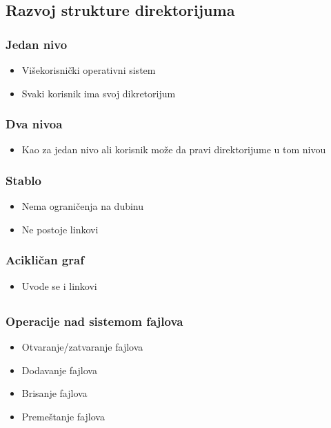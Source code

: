 \documentclass{beamer}
\begin{document}
\subsection*{Razvoj strukture direktorijuma}
\begin{frame}
    \frametitle{Jedan nivo}
    \begin{itemize}
        \item Višekorisnički operativni sistem \newline
        \item Svaki korisnik ima svoj dikretorijum 
    \end{itemize}
\end{frame}

\begin{frame}
    \frametitle{Dva nivoa}
    \begin{itemize}
        \item Kao za jedan nivo ali korisnik može da pravi direktorijume u tom nivou
    \end{itemize}

\end{frame}

\begin{frame}
    \frametitle{Stablo}
    \begin{itemize}
        \item Nema ograničenja na dubinu \newline
        \item Ne postoje linkovi
    \end{itemize}
\end{frame}

\begin{frame}
    \frametitle{Acikličan graf}
    \begin{itemize}
        \item Uvode se i linkovi
    \end{itemize}

\end{frame}

\subsection*{}

\begin{frame}
    \frametitle{Operacije nad sistemom fajlova}
    \begin{itemize}
        \item Otvaranje/zatvaranje fajlova \newline
        \item Dodavanje fajlova \newline
        \item Brisanje fajlova \newline
        \item Premeštanje fajlova
    \end{itemize}
\end{frame}
\end{document}
